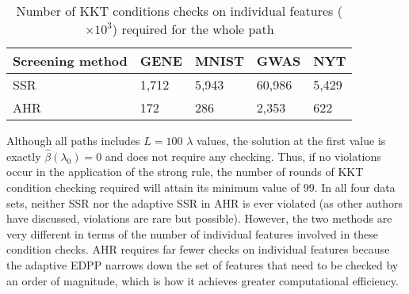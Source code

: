\begin{table}[H]
\centering
\begin{tabular}{lllll}
\toprule
Screening method & GENE & MNIST & GWAS & NYT \\
\midrule
SSR & 1,712 & 5,943 & 60,986 & 5,429 \\
AHR & 172 & 286 & 2,353 & 622 \\
\bottomrule
\end{tabular}
\caption{Number of KKT conditions checks on individual features ($\times10^3$) required for the whole path}
\label{Tab:kkt2}
\end{table}

Although all paths includes $L=100$ $\lambda$ values, the solution at the first value is exactly $\hat{\beta}(\lambda_0)=0$ and does not require any checking. Thus, if no violations occur in the application of the strong rule, the number of rounds of KKT condition checking required will attain its minimum value of $99$. In all four data sets, neither SSR nor the adaptive SSR in AHR is ever violated (as other authors have discussed, violations are rare but possible). However, the two methods are very different in terms of the number of individual features involved in these condition checks. AHR requires far fewer checks on individual features because the adaptive EDPP narrows down the set of features that need to be checked by an order of magnitude, which is how it achieves greater computational efficiency.
